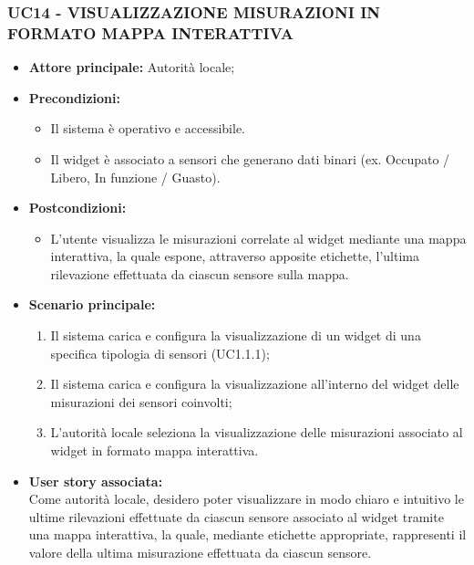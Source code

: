 \subsubsection{UC14 - VISUALIZZAZIONE MISURAZIONI IN FORMATO MAPPA INTERATTIVA}
\begin{itemize}
    \item \textbf{Attore principale:} Autorità locale;
    \item \textbf{Precondizioni:}
        \begin{itemize}
            \item Il sistema è operativo e accessibile.
            \item Il widget è associato a sensori che generano dati binari (ex. Occupato / Libero, In funzione / Guasto).
        \end{itemize}
    \item \textbf{Postcondizioni:}
        \begin{itemize}
            \item L'utente visualizza le misurazioni correlate al widget mediante una mappa interattiva, la quale espone, attraverso apposite etichette, l'ultima rilevazione effettuata da ciascun sensore sulla mappa.
        \end{itemize}
    \item \textbf{Scenario principale:}
        \begin{enumerate}
            \item Il sistema carica e configura la visualizzazione di un widget di una specifica tipologia di sensori (UC1.1.1);
            \item Il sistema carica e configura la visualizzazione all'interno del widget delle misurazioni dei sensori coinvolti;
            \item L'autorità locale seleziona la visualizzazione delle misurazioni associato al widget in formato mappa interattiva.
        \end{enumerate}
    \item \textbf{User story associata:} \\
        Come autorità locale, desidero poter visualizzare in modo chiaro e intuitivo le ultime rilevazioni effettuate da ciascun sensore associato al widget tramite una mappa interattiva, la quale, mediante etichette appropriate, rappresenti il valore della ultima misurazione effettuata da ciascun sensore.
\end{itemize}